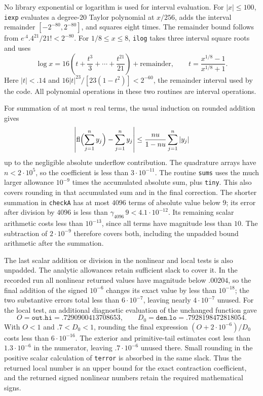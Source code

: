 \documentclass[11pt,a4paper]{article}
\numberwithin{equation}{section}
\theoremstyle{definition}
\theoremstyle{remark}
\begin{document}
No library exponential or logarithm is used for interval evaluation.
For $|x|\le100$, \texttt{iexp} evaluates a degree-$20$ Taylor polynomial at
$x/256$, adds the interval remainder $[-2^{-80},2^{-80}]$, and squares eight
times.  The remainder bound follows from
$e^{.4}.4^{21}/21!<2^{-80}$.
For $1/8\le x\le8$, \texttt{ilog} takes three interval square roots and
uses
\[
 \log x=16\left(t+\frac{t^3}3+\cdots+\frac{t^{21}}{21}\right)
             +\text{remainder},
 \qquad t=\frac{x^{1/8}-1}{x^{1/8}+1}.
\]
Here $|t|<.14$ and
$16|t|^{23}/[23(1-t^2)]<2^{-60}$, the remainder interval used by the code.
All polynomial operations in these two routines are interval operations.

For summation of at most $n$ real terms, the usual induction on rounded
addition gives
\[
 \left|\operatorname{fl}\Bigl(\sum_{j=1}^n y_j\Bigr)-\sum_{j=1}^n y_j\right|
 \le \frac{nu}{1-nu}\sum_{j=1}^n|y_j|
\]
up to the negligible absolute underflow contribution.  The quadrature arrays
have $n<2\cdot10^5$, so the coefficient is less than
$3\cdot10^{-11}$.  The routine \texttt{sums} uses the much larger allowance
$10^{-9}$ times the accumulated absolute sum, plus \texttt{tiny}.  This also
covers rounding in that accumulated sum and in the final correction.
The shorter summation in \texttt{checkA} has at most $4096$ terms of absolute
value below $9$; its error after division by $4096$ is less than
$\gamma_{4096}\,9<4.1\cdot10^{-12}$.  Its remaining scalar arithmetic
costs less than $10^{-13}$, since all terms have magnitude less than $10$.
The subtraction of $2\cdot10^{-9}$ therefore covers both, including the
unpadded bound arithmetic after the summation.

The last scalar addition or division in the nonlinear and local tests is
also unpadded.  The analytic allowances retain sufficient slack to cover it.
In the recorded run all nonlinear returned values have magnitude below
$.00204$, so the final addition of the signed $10^{-6}$ changes its exact
value by less than $10^{-18}$; the two substantive errors total less than
$6\cdot10^{-7}$, leaving nearly $4\cdot10^{-7}$ unused.
For the local test, an additional diagnostic evaluation of the unchanged
function gave
\[
 O=\texttt{out.hi}=.7290900413708653,\qquad
 D_0=\texttt{den.lo}=.7928198472818054.
\]
With $O<1$ and $.7<D_0<1$, rounding the final expression
$(O+2\cdot10^{-6})/D_0$ costs less than $6\cdot10^{-16}$.
The exterior and primitive-tail estimates cost less than $1.3\cdot10^{-6}$
in the numerator, leaving $.7\cdot10^{-6}$ unused there.  Small rounding in
the positive scalar calculation of \texttt{terror} is absorbed in the same
slack.  Thus the returned local number is an upper bound for the exact
contraction coefficient, and the returned signed nonlinear numbers retain
the required mathematical signs.
\end{document}
